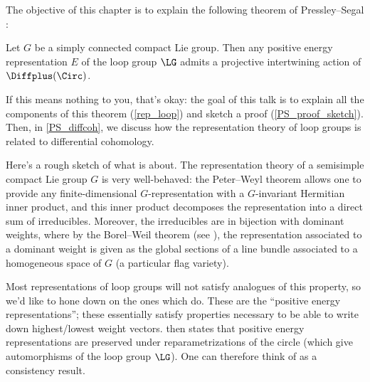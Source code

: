 The objective of this chapter is to explain the following theorem of Pressley--Segal \cite[Theorem 13.4.2]{loop}:
\begin{theorem}\label{main-thm}
	Let $G$ be a simply connected compact Lie group. Then any positive energy representation $E$ of the loop group
	$\LG$ admits a projective intertwining action of $\Diffplus(\Circ)$.
\end{theorem}
If this means nothing to you, that's okay: the goal of this talk is to explain all the components of this theorem
(\cref{rep_loop}) and sketch a proof (\cref{PS_proof_sketch}). Then, in \cref{PS_diffcoh}, we discuss how the
representation theory of loop groups is related to differential cohomology.


Here's a rough sketch of what  is about. The
representation theory of a semisimple compact Lie group $G$ is very well-behaved: the Peter--Weyl
theorem \cite{PW27}  allows one to provide any finite-dimensional
$G$-representation with a $G$-invariant Hermitian inner product, and this inner product decomposes the
representation into a direct sum of irreducibles. Moreover, the irreducibles are in bijection with dominant
weights, where by the Borel--Weil theorem (see \cite{Ser54}), the
representation associated to a dominant weight is given  as the global sections of a line bundle associated to a
homogeneous space of $G$ (a particular flag variety). 

Most representations of loop groups will not satisfy analogues of this property,
so we'd like to hone down on the ones which do. These are the ``positive energy
representations''; these essentially satisfy properties necessary to be able to
write down highest/lowest weight vectors.  then states
that positive energy representations are preserved under reparametrizations of
the circle (which give automorphisms of the loop group $\LG$). One can therefore
think of  as a consistency result.

